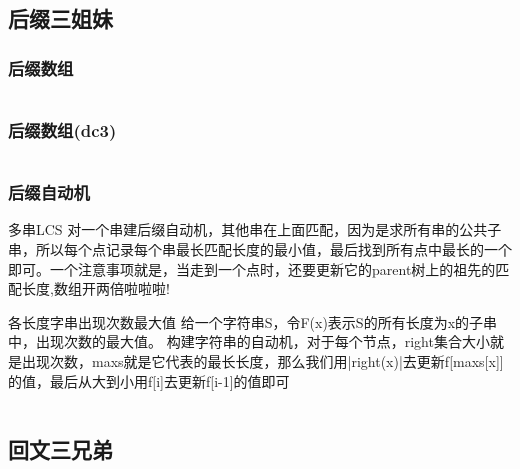 \documentclass[landscape, oneside, a4paper, cs4size]{book}
\newcommand{\cppcode}[1]{
	\inputminted[mathescape,
	frame=lines,linenos]{cpp}{source/#1}
}
\begin{document}
\begin{multicols}{2}
\begin{spacing}{0.8}
\cppcode{string-manipulation/ACmachine.cpp}


\subsection{后缀三姐妹}


\subsubsection{后缀数组}


\cppcode{string-manipulation/Sa.cpp}


\subsubsection{后缀数组(dc3)}

\cppcode{string-manipulation/DC3.cpp}


\subsubsection{后缀自动机}
\indent 多串LCS
\indent 对一个串建后缀自动机，其他串在上面匹配，因为是求所有串的公共子串，所以每个点记录每个串最长匹配长度的最小值，最后找到所有点中最长的一个即可。一个注意事项就是，当走到一个点时，还要更新它的parent树上的祖先的匹配长度,数组开两倍啦啦啦!


\indent 各长度字串出现次数最大值
\indent 给一个字符串S，令F(x)表示S的所有长度为x的子串中，出现次数的最大值。
\indent 构建字符串的自动机，对于每个节点，right集合大小就是出现次数，maxs就是它代表的最长长度，那么我们用|right(x)|去更新f[maxs[x]]的值，最后从大到小用f[i]去更新f[i-1]的值即可

\cppcode{string-manipulation/Sam-LCS.cpp}






\subsection{回文三兄弟}


\end{spacing}
\end{multicols}
\end{document}
